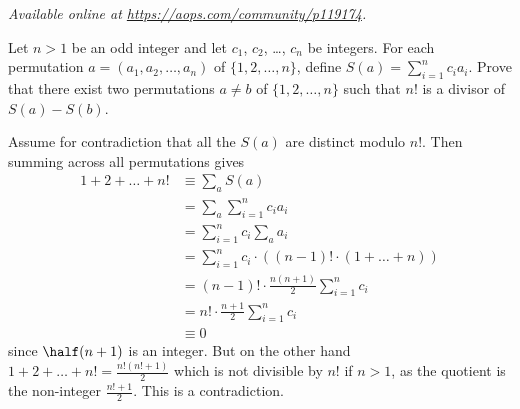 \textsl{Available online at \url{https://aops.com/community/p119174}.}
\begin{mdframed}[style=mdpurplebox,frametitle={Problem statement}]
Let $n > 1$ be an odd integer and let $c_1$, $c_2$, \dots, $c_n$ be integers.
For each permutation $a = (a_1, a_2, \dots, a_n)$
of $\{1,2,\dots,n\}$, define $S(a) = \sum_{i=1}^n c_i a_i$.
Prove that there exist two permutations $a \neq b$
of $\{1,2,\dots,n\}$ such that $n!$ is a divisor of $S(a)-S(b)$.
\end{mdframed}
Assume for contradiction that all the $S(a)$ are distinct modulo $n!$.
Then summing across all permutations gives
\begin{align*}
  1 + 2 + \dots + n!
  &\equiv \sum_a S(a) \\
  &= \sum_a \sum_{i=1}^n c_i a_i \\
  &= \sum_{i=1}^n c_i \sum_a a_i \\
  &= \sum_{i=1}^n c_i \cdot \left( (n-1)! \cdot (1+\dots+n) \right) \\
  &= (n-1)! \cdot \frac{n(n+1)}{2} \sum_{i=1}^n c_i \\
  &= n! \cdot \frac{n+1}{2} \sum_{i=1}^n c_i \\
  &\equiv 0
\end{align*}
since $\half(n+1)$ is an integer.
But on the other hand
$1 + 2 + \dots + n! = \frac{n!(n!+1)}{2}$
which is not divisible by $n!$ if $n > 1$,
as the quotient is the non-integer $\frac{n!+1}{2}$.
This is a contradiction.
\pagebreak